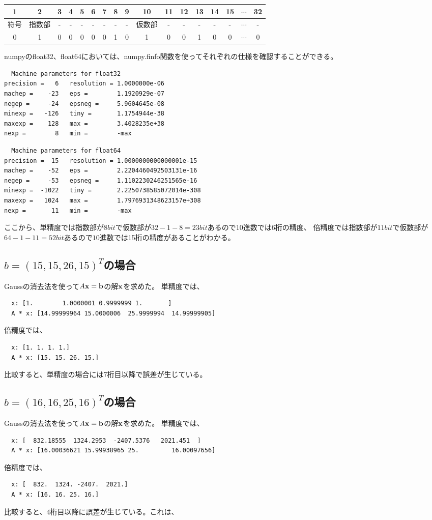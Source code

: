 \documentclass{jsarticle}
\newcommand{\bx}{\bold{x}}
\newcommand{\bb}{\bold{b}}
\begin{document}
\begin{tabular}{|c|c|c|c|c|c|c|c|c|c|c|c|c|c|c|c|c|}\hline
1&2&3&4&5&6&7&8&9&10&11&12&13&14&15&$\cdots$&32\\\hline
符号 & 指数部&-&-&-&-&-&-&-&仮数部&-&-&-&-&-&$\cdots$&-\\\hline
0&1&0&0&0&0&0&1&0&1&0&0&1&0&0&$\cdots$&0\\\hline
\end{tabular}



numpyのfloat32、float64においては、numpy.finfo関数を使ってそれぞれの仕様を確認することができる。

\begin{lstlisting}
  Machine parameters for float32
precision =   6   resolution = 1.0000000e-06
machep =    -23   eps =        1.1920929e-07
negep =     -24   epsneg =     5.9604645e-08
minexp =   -126   tiny =       1.1754944e-38
maxexp =    128   max =        3.4028235e+38
nexp =        8   min =        -max
\end{lstlisting}
\begin{lstlisting}
  Machine parameters for float64
precision =  15   resolution = 1.0000000000000001e-15
machep =    -52   eps =        2.2204460492503131e-16
negep =     -53   epsneg =     1.1102230246251565e-16
minexp =  -1022   tiny =       2.2250738585072014e-308
maxexp =   1024   max =        1.7976931348623157e+308
nexp =       11   min =        -max
\end{lstlisting}

ここから、単精度では指数部が$8bit$で仮数部が$32-1-8=23bit$あるので$10$進数では6桁の精度、
倍精度では指数部が$11bit$で仮数部が$64-1-11=52bit$あるので$10$進数では15桁の精度があることがわかる。
\subsection{$b=(15, 15, 26, 15)^T$の場合}
Gaussの消去法を使って$A\bx = \bb$の解$\bx$を求めた。
単精度では、
\begin{lstlisting}
  x: [1.        1.0000001 0.9999999 1.       ]
  A * x: [14.99999964 15.0000006  25.9999994  14.99999905]
\end{lstlisting}
倍精度では、
\begin{lstlisting}
  x: [1. 1. 1. 1.]
  A * x: [15. 15. 26. 15.]
\end{lstlisting}
比較すると、単精度の場合には$7$桁目以降で誤差が生じている。

\subsection{$b=(16, 16, 25, 16)^T$の場合}
Gaussの消去法を使って$A\bx = \bb$の解$\bx$を求めた。
単精度では、
\begin{lstlisting}
  x: [  832.18555  1324.2953  -2407.5376   2021.451  ]
  A * x: [16.00036621 15.99938965 25.         16.00097656]
\end{lstlisting}
倍精度では、
\begin{lstlisting}
  x: [  832.  1324. -2407.  2021.]
  A * x: [16. 16. 25. 16.]
\end{lstlisting}
比較すると、$4$桁目以降に誤差が生じている。これは、
\end{document}

